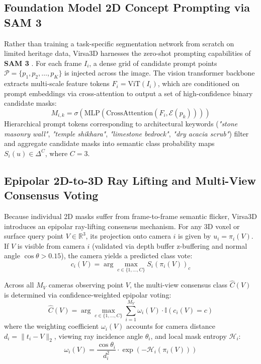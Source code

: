 \documentclass[11pt,a4paper]{article}
\begin{document}
\subsection{Foundation Model 2D Concept Prompting via SAM 3}
Rather than training a task-specific segmentation network from scratch on limited heritage data, Virsa3D harnesses the zero-shot prompting capabilities of \textbf{SAM 3} \cite{ravi2024sam2}. For each frame $I_i$, a dense grid of candidate prompt points $\mathcal{P} = \{p_1, p_2, \dots, p_K\}$ is injected across the image. The vision transformer backbone extracts multi-scale feature tokens $F_i = \text{ViT}(I_i)$, which are conditioned on prompt embeddings via cross-attention to output a set of high-confidence binary candidate masks:
\begin{equation}
    M_{i, k} = \sigma\left( \text{MLP}\left( \text{CrossAttention}(F_i, \mathcal{E}(p_k)) \right) \right)
    \label{eq:sam_mask}
\end{equation}
Hierarchical prompt tokens corresponding to architectural keywords (\textit{"stone masonry wall"}, \textit{"temple shikhara"}, \textit{"limestone bedrock"}, \textit{"dry acacia scrub"}) filter and aggregate candidate masks into semantic class probability maps $S_i(u) \in \Delta^C$, where $C = 3$.

\subsection{Epipolar 2D-to-3D Ray Lifting and Multi-View Consensus Voting}
Because individual 2D masks suffer from frame-to-frame semantic flicker, Virsa3D introduces an epipolar ray-lifting consensus mechanism. For any 3D voxel or surface query point $V \in \mathbb{R}^3$, its projection onto camera $i$ is given by $u_i = \pi_i(V)$. If $V$ is visible from camera $i$ (validated via depth buffer z-buffering and normal angle $\cos\theta > 0.15$), the camera yields a predicted class vote:
\begin{equation}
    c_i(V) = \arg\max_{c \in \{1, \dots, C\}} S_i(\pi_i(V))_c
    \label{eq:camera_vote}
\end{equation}

Across all $M_V$ cameras observing point $V$, the multi-view consensus class $\hat{C}(V)$ is determined via confidence-weighted epipolar voting:
\begin{equation}
    \hat{C}(V) = \arg\max_{c \in \{1, \dots, C\}} \sum_{i=1}^{M_V} \omega_i(V) \cdot \mathbb{I}\left( c_i(V) = c \right)
    \label{eq:consensus_voting}
\end{equation}
where the weighting coefficient $\omega_i(V)$ accounts for camera distance $d_i = \| t_i - V \|_2$, viewing ray incidence angle $\theta_i$, and local mask entropy $\mathcal{H}_i$:
\begin{equation}
    \omega_i(V) = \frac{\cos\theta_i}{d_i^2} \cdot \exp\left( - \mathcal{H}_i(\pi_i(V)) \right)
    \label{eq:vote_weight}
\end{equation}
\end{document}
